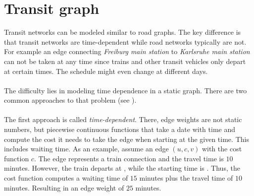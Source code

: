 \section{Transit graph}\label{transitGraph}
	Transit networks can be modeled similar to road graphs. The key difference is that transit networks are time-dependent
	while road networks typically are not. For example an edge connecting \textit{Freiburg main station} to \textit{Karlsruhe main station}
	can not be taken at any time since trains and other transit vehicles only depart at certain times. The schedule might even change
	at different days.\\\\
	The difficulty lies in modeling time dependence in a static graph. There are two common approaches to that problem
	(see ).\\\\
	The first approach is called \textit{time-dependent}. There, edge weights are not static numbers, but piecewise
	continuous functions that take a date with time and compute the cost it needs to take the edge when starting at the given time.
	This includes waiting time. As an example, assume an edge $(u, c, v)$ with the cost function $c$. The edge represents a
	train connection and the travel time is $10$ minutes. However, the train departs at , while the starting time
	is . Thus, the cost function computes a waiting time of $15$ minutes plus the travel time of $10$ minutes.
	Resulting in an edge weight of $25$ minutes.
	
